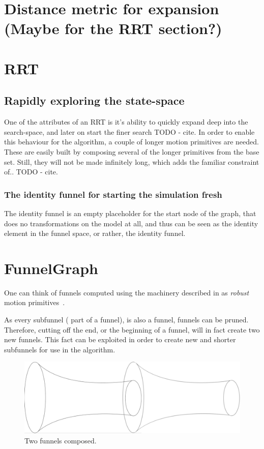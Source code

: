 \section{Distance metric for expansion (Maybe for the RRT section?)}

\section{RRT}

\subsection{Rapidly exploring the state-space}

One of the attributes of an \ac{RRT} is it's ability to quickly expand deep into
the search-space, and later on start the finer search TODO - cite. In order to
enable this behaviour for the \rrtfunnel{} algorithm, a couple of longer motion
primitives are needed. These are easily built by composing several of the longer
primitives from the base set. Still, they will not be made infinitely long,
which adds the familiar constraint of.. TODO - cite.

\subsubsection{The identity funnel for starting the simulation fresh}

The identity funnel is an empty placeholder for the start node of the graph,
that does no transformations on the model at all, and thus can be seen as the
identity element in the funnel space, or rather, the identity funnel.

\section{FunnelGraph}

One can think of funnels computed using the machinery described in
\cite[sec~4]{majumdarFunnelLibrariesRealtime2017} as \textit{robust} motion
primitives~\cite{majumdarFunnelLibrariesRealtime2017}.

As every subfunnel (\ie{} part of a funnel), is also a funnel, funnels can be
pruned. Therefore, cutting off the end, or the beginning of a funnel, will in
fact create two new funnels. This fact can be exploited in order to create new
and shorter subfunnels for use in the \rrtfunnel{} algorithm.

\begin{figure}
  \includegraphics[scale=.2]{figures/method/funnel-composition}
  \centering
  \caption{Two funnels composed.}
\end{figure}

